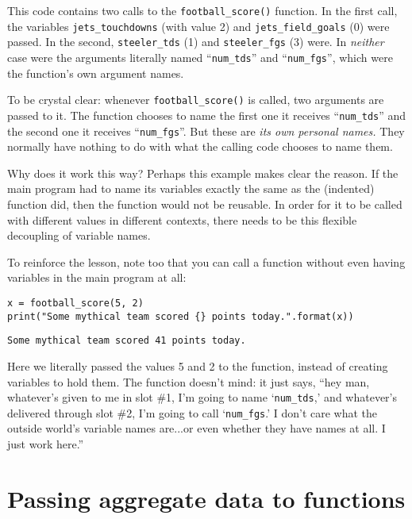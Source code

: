 This code contains two calls to the \texttt{football\_score()} function. In the
first call, the variables \texttt{jets\_touchdowns} (with value 2) and
\texttt{jets\_field\_goals} (0) were passed. In the second,
\texttt{steeler\_tds} (1) and \texttt{steeler\_fgs} (3) were. In
\textit{neither} case were the arguments literally named ``\texttt{num\_tds}''
and ``\texttt{num\_fgs}'', which were the function's own argument names.

To be crystal clear: whenever \texttt{football\_score()} is called, two
arguments are passed to it. The function chooses to name the first one it
receives ``\texttt{num\_tds}'' and the second one it receives
``\texttt{num\_fgs}''. But these are \textit{its own personal names.} They
normally have nothing to do with what the calling code chooses to name them.

Why does it work this way? Perhaps this example makes clear the reason. If the
main program had to name its variables exactly the same as the (indented)
function did, then the function would not be reusable. In order for it to be
called with different values in different contexts, there needs to be this
flexible decoupling of variable names.

To reinforce the lesson, note too that you can call a function without even
having variables in the main program at all:

\begin{Verbatim}[fontsize=\small,samepage=true,frame=single,framesep=3mm]
x = football_score(5, 2)
print("Some mythical team scored {} points today.".format(x))
\end{Verbatim}
\vspace{-.2in}

\begin{Verbatim}[fontsize=\small,samepage=true,frame=leftline,framesep=5mm,framerule=1mm]
Some mythical team scored 41 points today.
\end{Verbatim}

Here we literally passed the values 5 and 2 to the function, instead of
creating variables to hold them. The function doesn't mind: it just says, ``hey
man, whatever's given to me in slot \#1, I'm going to name `\texttt{num\_tds},'
and whatever's delivered through slot \#2, I'm going to call
`\texttt{num\_fgs}.' I don't care what the outside world's variable names
are...or even whether they have names at all. I just work here.''

\section{Passing aggregate data to functions}

